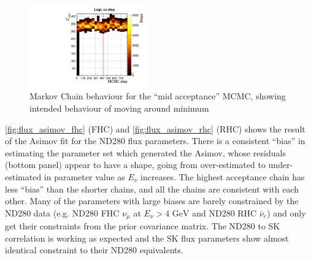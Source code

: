 \begin{figure}[h]
	\includegraphics[width=0.45\textwidth]{figures/mach3/mcmc/2017b_NewDet_3Xsec_4Det_5Flux_NewXSecTune_Asimov_merge}
	\caption{Markov Chain behaviour for the ``mid acceptance'' MCMC, showing intended behaviour of moving around minimum}
	\label{fig:mcmc_asimov_loglsteps}
\end{figure}

\autoref{fig:flux_asimov_fhc} (FHC) and \autoref{fig:flux_asimov_rhc} (RHC) shows the result of the Asimov fit for the ND280 flux parameters. There is a consistent ``bias'' in estimating the parameter set which generated the Asimov, whose residuals (bottom panel) appear to have a shape, going from over-estimated to under-estimated in parameter value as $E_\nu$ increases. The highest acceptance chain has less ``bias'' than the shorter chains, and all the chains are consistent with each other. Many of the parameters with large biases are barely constrained by the ND280 data (e.g. ND280 FHC $\nu_\mu$ at $E_\nu > 4\text{ GeV}$ and ND280 RHC $\bar{\nu}_e$) and only get their constraints from the prior covariance matrix. The ND280 to SK correlation is working as expected and the SK flux parameters show almost identical constraint to their ND280 equivalents.

